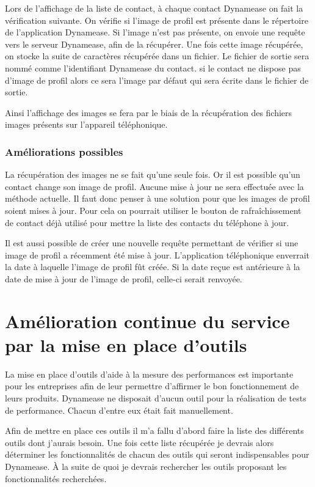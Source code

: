 Lors de l'affichage de la liste de contact, à chaque contact Dynamease on fait la vérification suivante. On vérifie si l'image de profil est présente dans le répertoire de l'application Dynamease. Si l'image n'est pas présente, on envoie une requête vers le serveur Dynamease, afin de la récupérer. Une fois cette image récupérée, on stocke la suite de caractères récupérée dans un fichier. Le fichier de sortie sera nommé comme l'identifiant Dynamease du contact. si le contact ne dispose pas d'image de profil alors ce sera l'image par défaut qui sera écrite dans le fichier de sortie.

Ainsi l'affichage des images se fera par le biais de la récupération des fichiers images présents sur l'appareil téléphonique.

\subsubsection{Améliorations possibles}

La récupération des images ne se fait qu'une seule fois. Or il est possible qu'un contact change son image de profil. Aucune mise à jour ne sera effectuée avec la méthode actuelle. Il faut donc penser à une solution pour que les images de profil soient mises à jour. Pour cela on pourrait utiliser le bouton de rafraîchissement de contact déjà utilisé pour mettre la liste des contacts du téléphone à jour.

Il est aussi possible de créer une nouvelle requête permettant de vérifier si une image de profil a récemment été mise à jour. L'application téléphonique enverrait la date à laquelle l'image de profil fût créée. Si la date reçue est antérieure à la date de mise à jour de l'image de profil, celle-ci serait renvoyée.


\section{Amélioration continue du service par la mise en place d'outils}

La mise en place d'outils d'aide à la mesure des performances est importante pour les entreprises afin de leur permettre d'affirmer le bon fonctionnement de leurs produits. Dynamease ne disposait d'aucun outil pour la réalisation de tests de performance. Chacun d'entre eux était fait manuellement.

Afin de mettre en place ces outils il m'a fallu d'abord faire la liste des différents outils dont j'aurais besoin. Une fois cette liste récupérée je devrais alors déterminer les fonctionnalités de chacun des outils qui seront indispensables pour Dynamease. À la suite de quoi je devrais rechercher les outils proposant les fonctionnalités recherchées.

